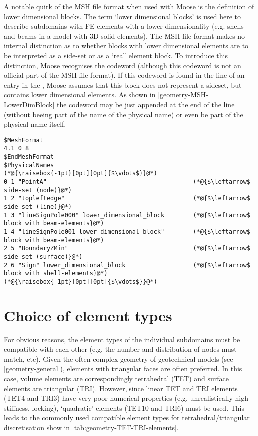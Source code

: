A notable quirk of the MSH file format when used with Moose is the definition
of lower dimensional blocks. The term ‘lower dimensional blocks’ is used here
to describe subdomains with FE elements with a lower dimensionality (e.g.
shells and beams in a model with 3D solid elements). The MSH file format makes
no internal distinction as to whether blocks with lower dimensional elements
are to be interpreted as a side-set or as a ‘real’ element block. To introduce
this distinction, Moose recognises the codeword 
(although this codeword is not an official part of the MSH file
format). If this codeword is found in the line of an entry in the
, Moose assumes that this block does not represent a
sideset, but contains lower dimensional elements. As shown in
\autoref{geometry-MSH-LowerDimBlock} the codeword may be just appended at the
end of the line (without beeing part of the name of the physical name) or even
be part of the physical name itself.

\begin{lstlisting}[float, caption={Fragment of an MSH file containing ‘lower dimensional blocks’},label={geometry-MSH-LowerDimBlock}]
$MeshFormat
4.1 0 8
$EndMeshFormat
$PhysicalNames
(*@{\raisebox{-1pt}[0pt][0pt]{$\vdots$}}@*)
0 1 "PointA"                                         (*@{$\leftarrow$ side-set (node)}@*)
1 2 "topleftedge"                                    (*@{$\leftarrow$ side-set (line)}@*)
1 3 "lineSignPole000" lower_dimensional_block        (*@{$\leftarrow$ block with beam-elements}@*)
1 4 "lineSignPole001_lower_dimensional_block"        (*@{$\leftarrow$ block with beam-elements}@*)
2 5 "BoundaryZMin"                                   (*@{$\leftarrow$ side-set (surface)}@*)
2 6 "Sign" lower_dimensional_block                   (*@{$\leftarrow$ block with shell-elements}@*)
(*@{\raisebox{-1pt}[0pt][0pt]{$\vdots$}}@*)
\end{lstlisting}

\section{Choice of element types}
\label{geometry-element-types}

For obvious reasons, the element types of the individual subdomains must be
compatible with each other (e.g. the number and distribution of nodes must
match, etc). Given the often complex geometry of geotechnical models (see
\autoref{geometry-general}), elements with triangular faces are often
preferred. In this case, volume elements are correspondingly tetrahedral (TET)
and surface elements are triangular (TRI). However, since linear TET and TRI
elements (TET4 and TRI3) have very poor numerical properties (e.g.
unrealistically high stiffness, locking), ‘quadratic’ elements (TET10 and TRI6)
must be used. This leads to the commonly used compatible element types for
tetrahedral/triangular discretisation show in
\autoref{tab:geometry-TET-TRI-elements}.


